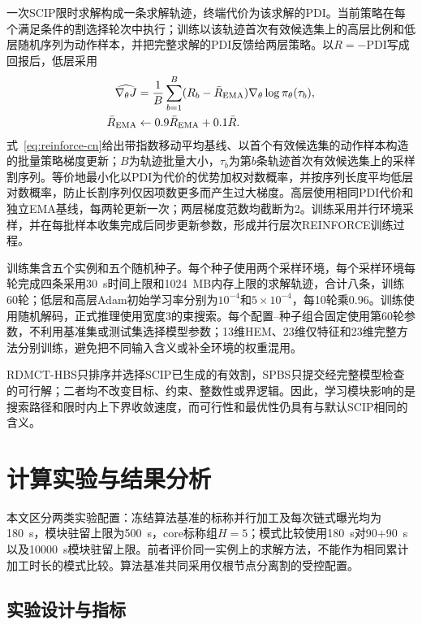 \documentclass[journal]{IEEEtran}
\newcommand{\method}{RDMCT-HBS}
\newcommand{\pdi}{\mathrm{PDI}}
\begin{document}
一次SCIP限时求解构成一条求解轨迹，终端代价为该求解的PDI。当前策略在每个满足条件的割选择轮次中执行；训练以该轨迹首次有效候选集上的高层比例和低层随机序列为动作样本，并把完整求解的PDI反馈给两层策略。以$R=-\pdi$写成回报后，低层采用
\begin{equation}
\begin{aligned}
\widehat{\nabla_\theta J}
&=\frac1B\sum_{b=1}^B(R_b-\bar R_{\rm EMA})
\nabla_\theta\log\pi_\theta(\tau_b),\\
\bar R_{\rm EMA}&\leftarrow0.9\bar R_{\rm EMA}+0.1\bar R.
\end{aligned}
\label{eq:reinforce-cn}
\end{equation}
式~\eqref{eq:reinforce-cn}给出带指数移动平均基线、以首个有效候选集的动作样本构造的批量策略梯度更新；$B$为轨迹批量大小，$\tau_b$为第$b$条轨迹首次有效候选集上的采样割序列。等价地最小化以PDI为代价的优势加权对数概率，并按序列长度平均低层对数概率，防止长割序列仅因项数更多而产生过大梯度。高层使用相同PDI代价和独立EMA基线，每两轮更新一次；两层梯度范数均截断为2。训练采用并行环境采样，并在每批样本收集完成后同步更新参数，形成并行层次REINFORCE训练过程\cite{williams1992reinforce,mnih2016a3c}。

训练集含五个实例和五个随机种子。每个种子使用两个采样环境，每个采样环境每轮完成四条采用30~s时间上限和1024~MB内存上限的求解轨迹，合计八条，训练60轮；低层和高层Adam初始学习率分别为$10^{-4}$和$5\times10^{-4}$，每10轮乘0.96。训练使用随机解码，正式推理使用宽度3的束搜索。每个配置--种子组合固定使用第60轮参数，不利用基准集或测试集选择模型参数；13维HEM、23维仅特征和23维完整方法分别训练，避免把不同输入含义或补全环境的权重混用。

\method{}只排序并选择SCIP已生成的有效割，SPBS只提交经完整模型检查的可行解；二者均不改变目标、约束、整数性或界逻辑。因此，学习模块影响的是搜索路径和限时内上下界收敛速度，而可行性和最优性仍具有与默认SCIP相同的含义。

\section{计算实验与结果分析}
本文区分两类实验配置：冻结算法基准的标称并行加工及每次链式曝光均为180~s，模块驻留上限为500~s，core标称组$H=5$；模式比较使用180~s对90+90~s以及10000~s模块驻留上限。前者评价同一实例上的求解方法，不能作为相同累计加工时长的模式比较。算法基准共同采用仅根节点分离割的受控配置。

\subsection{实验设计与指标}
\end{document}
